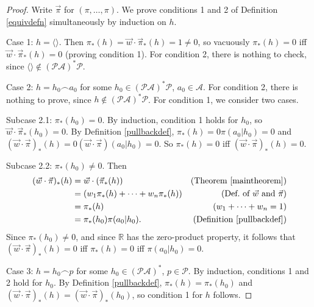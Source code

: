 \documentclass[runningheads]{llncs}
\begin{document}
\begin{proof}
    Write $\vec\pi$ for $(\pi,\ldots,\pi)$.
    We prove conditions 1 and 2 of Definition \ref{equivdefn}
    simultaneously by induction on $h$.
 
    Case 1: $h=\langle\rangle$. Then
    $\pi_*(h)=\vec w\cdot\vec\pi_*(h)=1\not=0$, so
    vacuously $\pi_*(h)=0$ iff $\vec w\cdot\vec\pi_*(h)=0$
    (proving condition 1).
    For condition 2, there is nothing to check, since
    $\langle\rangle\not\in(\mathcal P\mathcal A)^*\mathcal P$.

    Case 2: $h=h_0\frown a_0$ for some
        $h_0\in(\mathcal P\mathcal A)^*\mathcal P$, $a_0\in\mathcal A$.
        For condition 2, there is nothing to prove, since
        $h\not\in(\mathcal P\mathcal A)^*\mathcal P$.
        For condition 1, we consider two cases.

        Subcase 2.1: $\pi_*(h_0)=0$.
        By induction, condition 1 holds for $h_0$, so
        $\vec w\cdot\vec\pi_*(h_0)=0$.
        By Definition \ref{pullbackdef},
        $\pi_*(h)=0\pi(a_0|h_0)=0$
        and $(\vec w\cdot\vec\pi)_*(h)=0(\vec w\cdot\vec\pi)(a_0|h_0)=0$.
        So $\pi_*(h)=0$ iff $(\vec w\cdot\vec\pi)_*(h)=0$.

        Subcase 2.2: $\pi_*(h_0)\not=0$.
        Then
        \begin{align*}
            (\vec w\cdot \vec\pi)_*(h)
                &= \vec w\cdot(\vec\pi_*(h))
                    &\mbox{(Theorem \ref{maintheorem})}\\
                &= (w_1\pi_*(h)+\cdots+w_n\pi_*(h))
                    &\mbox{(Def.\ of $\vec w$ and $\vec\pi$)}\\
                &= \pi_*(h)
                    &\mbox{($w_1+\cdots+w_n=1$)}\\
                &= \pi_*(h_0)\pi(a_0|h_0).
                    &\mbox{(Definition \ref{pullbackdef})}
        \end{align*}
        Since $\pi_*(h_0)\not=0$, and since $\mathbb R$ has the zero-product property,
        it follows that
        $(\vec w\cdot\vec\pi)_*(h)=0$ iff $\pi_*(h)=0$ iff $\pi(a_0|h_0)=0$.

    Case 3: $h=h_0\frown p$ for some $h_0\in (\mathcal P\mathcal A)^*$,
        $p\in\mathcal P$.
        By induction, conditions 1 and 2 hold for $h_0$.
        By Definition \ref{pullbackdef},
        $\pi_*(h)=\pi_*(h_0)$ and $(\vec w\cdot\vec\pi)_*(h)=(\vec w\cdot\vec\pi)_*(h_0)$,
        so condition 1 for $h$ follows.


\end{proof}
\end{document}

